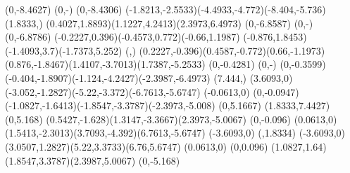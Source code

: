 {    %
        \rlineto(0,-8.4627)
        \rlineto(0,-)
        \rlineto(0,-8.4306)
    \rcurveto(-1.8213,-2.5533)(-4.4933,-4.772)(-8.404,-5.736) %
    \moveto(1.8333,) %
    \rcurveto(0.4027,1.8893)(1.1227,4.2413)(2.3973,6.4973) %
        \rlineto(0,-6.8587)
        \rlineto(0,-)
        \rlineto(0,-6.8786)
    \rcurveto(-0.2227,0.396)(-0.4573,0.772)(-0.66,1.1987) %
    \rcurveto(-0.876,1.8453)(-1.4093,3.7)(-1.7373,5.252) %
    \closepath %
    \moveto(,) %
    \rcurveto(0.2227,-0.396)(0.4587,-0.772)(0.66,-1.1973) %
    \rcurveto(0.876,-1.8467)(1.4107,-3.7013)(1.7387,-5.2533) %
        \rlineto(0,-0.4281)
        \rlineto(0,-)
        \rlineto(0,-0.3599)
    \rcurveto(-0.404,-1.8907)(-1.124,-4.2427)(-2.3987,-6.4973) %
    \closepath %
    \moveto(7.444,) %
    \rlineto(3.6093,0) %
    \rcurveto(-3.052,-1.2827)(-5.22,-3.372)(-6.7613,-5.6747) %
    \rlineto(-0.0613,0) %
    \rlineto(0,-0.0947) %
    \rcurveto(-1.0827,-1.6413)(-1.8547,-3.3787)(-2.3973,-5.008) %
    \rlineto(0,5.1667) %
    \closepath %
    \moveto(1.8333,7.4427) %
    \rlineto(0,5.168) %
    \rcurveto(0.5427,-1.628)(1.3147,-3.3667)(2.3973,-5.0067) %
    \rlineto(0,-0.096) %
    \rlineto(0.0613,0) %
    \rcurveto(1.5413,-2.3013)(3.7093,-4.392)(6.7613,-5.6747) %
    \rlineto(-3.6093,0) %
    \closepath %
    \moveto(,1.8334) %
    \rlineto(-3.6093,0) %
    \rcurveto(3.0507,1.2827)(5.22,3.3733)(6.76,5.6747) %
    \rlineto(0.0613,0) %
    \rlineto(0,0.096) %
    \rcurveto(1.0827,1.64)(1.8547,3.3787)(2.3987,5.0067) %
    \rlineto(0,-5.168) %
    \closepath %
}